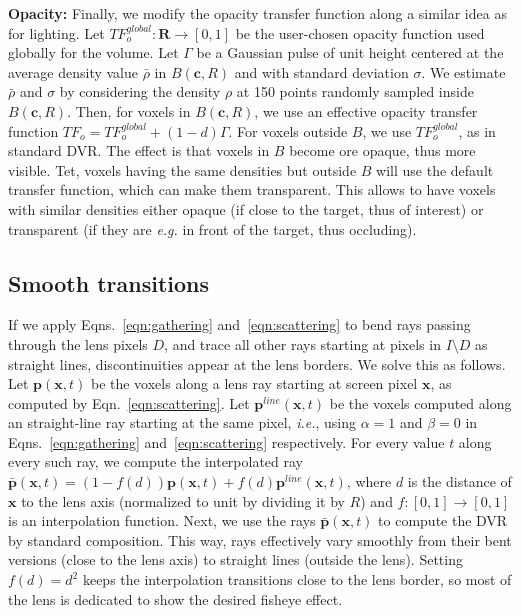 \vspace{0.2cm}
\noindent\textbf{Opacity:} Finally, we modify the opacity transfer function along a similar idea as for lighting. Let $TF_{o}^{global} : \mathbf{R} \rightarrow [0,1]$ be the user-chosen opacity function used globally for the volume. Let $\Gamma$ be a Gaussian pulse of unit height centered at the average density value $\bar{\rho}$ in $B(\mathbf{c},R)$ and with standard deviation $\sigma$. We estimate $\bar{\rho}$ and $\sigma$ by considering the density $\rho$ at 150 points randomly sampled inside $B(\mathbf{c},R)$. Then, for voxels in $B(\mathbf{c},R)$, we use an effective opacity transfer function $TF_o = TF_{o}^{global} + (1-d) \Gamma$. For voxels outside $B$, we use $TF_{o}^{global}$, as in standard DVR. The effect is that voxels in $B$ become ore opaque, thus more visible. Tet, voxels having the same densities but outside $B$ will use the default transfer function, which can make them transparent. This allows to have voxels with similar densities either opaque (if close to the target, thus of interest) or transparent (if they are \emph{e.g.} in front of the target, thus occluding).


\subsection{Smooth transitions}
\label{continuity}
%
If we apply Eqns.~\ref{eqn:gathering} and~\ref{eqn:scattering} to bend rays passing through the lens pixels $D$, and trace all other rays starting at pixels in $I \setminus D$ as straight lines, discontinuities appear at the lens borders. We solve this as follows. Let $\mathbf{p}(\mathbf{x},t)$ be the voxels along a lens ray starting at screen pixel $\mathbf{x}$, as computed by Eqn.~\ref{eqn:scattering}. Let $\mathbf{p}^{line}(\mathbf{x},t)$ be the voxels computed along an straight-line ray starting at the same pixel, \emph{i.e.}, using $\alpha=1$ and $\beta=0$ in Eqns.~\ref{eqn:gathering} and~\ref{eqn:scattering} respectively. For every value $t$ along every such ray, we compute the interpolated ray
$\bar{\mathbf{p}}(\mathbf{x},t) = (1-f(d))\mathbf{p}(\mathbf{x},t) + f(d)\mathbf{p}^{line}(\mathbf{x},t)$, where $d$ is the distance of $\mathbf{x}$ to the lens axis (normalized to unit by dividing it by $R$) and $f : [0,1] \rightarrow [0,1]$ is an interpolation function. Next, we use the rays $\bar{\mathbf{p}}(\mathbf{x},t)$ to compute the DVR by standard composition. This way, rays effectively vary smoothly from their bent versions (close to the lens axis) to straight lines (outside the lens). Setting $f(d) = d^2$ keeps the interpolation transitions close to the lens border, so most of the lens is dedicated to show the desired fisheye effect.


